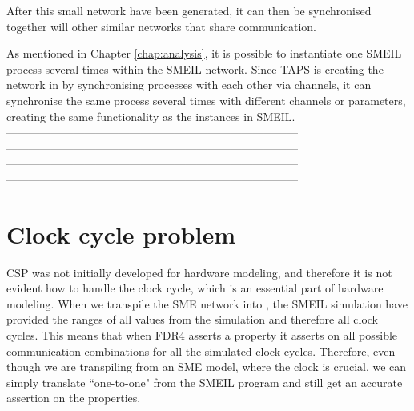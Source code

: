 After this small network have been generated, it can then be synchronised together will other similar networks that share communication.


As mentioned in Chapter \ref{chap:analysis}, it is possible to instantiate one SMEIL process several times within the SMEIL network. Since TAPS is creating the network in \cspm{} by synchronising processes with each other via channels, it can synchronise the same process several times with different channels or parameters, creating the same functionality as the instances in SMEIL.\\

------------------------------------------------------------------------------\\
------------------------------------------------------------------------------\\
------------------------------------------------------------------------------\\
------------------------------------------------------------------------------\\



\section{Clock cycle problem}
% 

CSP was not initially developed for hardware modeling, and therefore it is not evident how to handle the clock cycle, which is an essential part of hardware modeling. When we transpile the SME network into \cspm{}, the SMEIL simulation have provided the ranges of all values from the simulation and therefore all clock cycles. This means that when FDR4 asserts a property it asserts on all possible communication combinations for all the simulated clock cycles. Therefore, even though we are transpiling from an SME model, where the clock is crucial, we can simply translate ``one-to-one" from the SMEIL program and still get an accurate assertion on the properties.













